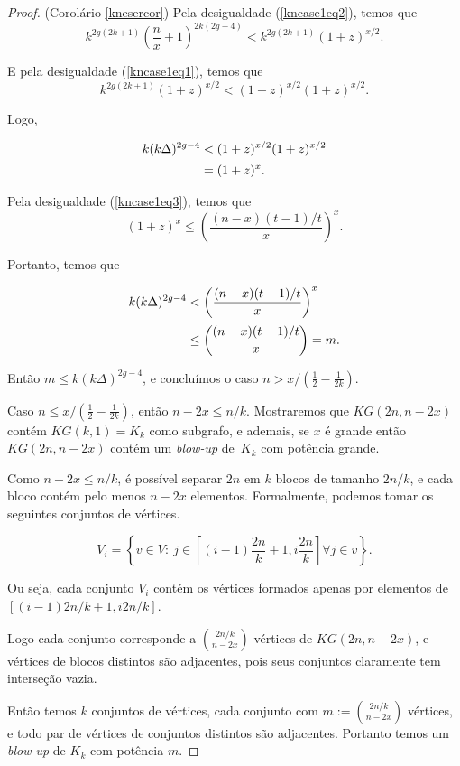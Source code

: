 \begin{proof}{(Corolário \ref{knesercor})}
Pela desigualdade (\ref{kncase1eq2}), temos que \[k^{2g(2k+1)}\left(\frac{n}{x}+1\right)^{2k(2g-4)}< k^{2g(2k+1)}\left(1+z\right)^{x/2}.\]

E pela desigualdade (\ref{kncase1eq1}), temos que \[k^{2g(2k+1)}\left(1+z\right)^{x/2} < (1+z)^{x/2}(1+z)^{x/2}.\]

Logo,

\begin{equation*}
\setlength{\jot}{5pt}
\begin{aligned}
k(k\Delta)^{2g-4} & < (1+z)^{x/2}(1+z)^{x/2} \\
& = (1+z)^x.
\end{aligned}
\end{equation*}

Pela desigualdade (\ref{kncase1eq3}), temos que \[(1+z)^x \leq \left(\frac{(n-x)(t-1)/t}{x}\right)^x.\]

Portanto, temos que

\begin{equation*}
\setlength{\jot}{5pt}
\begin{aligned}
k(k\Delta)^{2g-4} & < \left(\frac{(n-x)(t-1)/t}{x}\right)^x \\
 & \leq \binom{(n-x)(t-1)/t}{x} = m.
\end{aligned}
\end{equation*}

Então $m \leq k(k\Delta)^{2g-4}$, e concluímos o caso $n > x/(\frac{1}{2} - \frac{1}{2k})$.

Caso $n \leq x/(\frac{1}{2} - \frac{1}{2k})$, então $n-2x \leq n/k$. Mostraremos que $KG(2n,n-2x)$ contém $KG(k,1) = K_k$ como subgrafo, e ademais, se $x$ é grande então $KG(2n,n-2x)$ contém um \textit{blow-up} de~$K_k$ com potência grande.

Como $n-2x \leq n/k$, é possível separar $2n$ em $k$ blocos de tamanho $2n/k$, e cada bloco contém pelo menos $n-2x$ elementos. Formalmente, podemos tomar os seguintes conjuntos de vértices.

\[V_i = \left\{v \in V : \ j \in \left[(i-1)\frac{2n}{k}+1, i\frac{2n}{k}\right]\forall j \in v\right\}.\]

Ou seja, cada conjunto $V_i$ contém os vértices formados apenas por elementos de $[(i-1)2n/k+1, i2n/k]$.

Logo cada conjunto corresponde a $\binom{2n/k}{n-2x}$ vértices de $KG(2n, n-2x)$, e vértices de blocos distintos são adjacentes, pois seus conjuntos claramente tem interseção vazia.

Então temos $k$ conjuntos de vértices, cada conjunto com $m := \binom{2n/k}{n-2x}$ vértices, e todo par de vértices de conjuntos distintos são adjacentes. Portanto temos um \textit{blow-up} de $K_k$ com potência $m$.


\end{proof}

